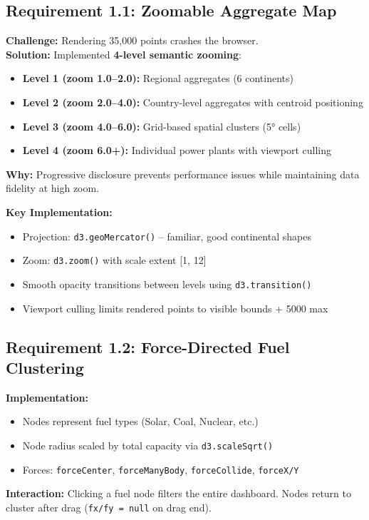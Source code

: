 \documentclass[11pt,a4paper]{article}
\begin{document}
\subsection{Requirement 1.1: Zoomable Aggregate Map}
\textbf{Challenge:} Rendering 35,000 points crashes the browser.\\
\textbf{Solution:} Implemented \textbf{4-level semantic zooming}:
\begin{itemize}[noitemsep]
    \item \textbf{Level 1 (zoom 1.0--2.0):} Regional aggregates (6 continents)
    \item \textbf{Level 2 (zoom 2.0--4.0):} Country-level aggregates with centroid positioning
    \item \textbf{Level 3 (zoom 4.0--6.0):} Grid-based spatial clusters (5° cells)
    \item \textbf{Level 4 (zoom 6.0+):} Individual power plants with viewport culling
\end{itemize}
\textbf{Why:} Progressive disclosure prevents performance issues while maintaining data fidelity at high zoom.

\textbf{Key Implementation:}
\begin{itemize}[noitemsep]
    \item Projection: \texttt{d3.geoMercator()} -- familiar, good continental shapes
    \item Zoom: \texttt{d3.zoom()} with scale extent [1, 12]
    \item Smooth opacity transitions between levels using \texttt{d3.transition()}
    \item Viewport culling limits rendered points to visible bounds + 5000 max
\end{itemize}

\subsection{Requirement 1.2: Force-Directed Fuel Clustering}
\textbf{Implementation:}
\begin{itemize}[noitemsep]
    \item Nodes represent fuel types (Solar, Coal, Nuclear, etc.)
    \item Node radius scaled by total capacity via \texttt{d3.scaleSqrt()}
    \item Forces: \texttt{forceCenter}, \texttt{forceManyBody}, \texttt{forceCollide}, \texttt{forceX/Y}
\end{itemize}
\textbf{Interaction:} Clicking a fuel node filters the entire dashboard. Nodes return to cluster after drag (\texttt{fx/fy = null} on drag end).
\end{document}
